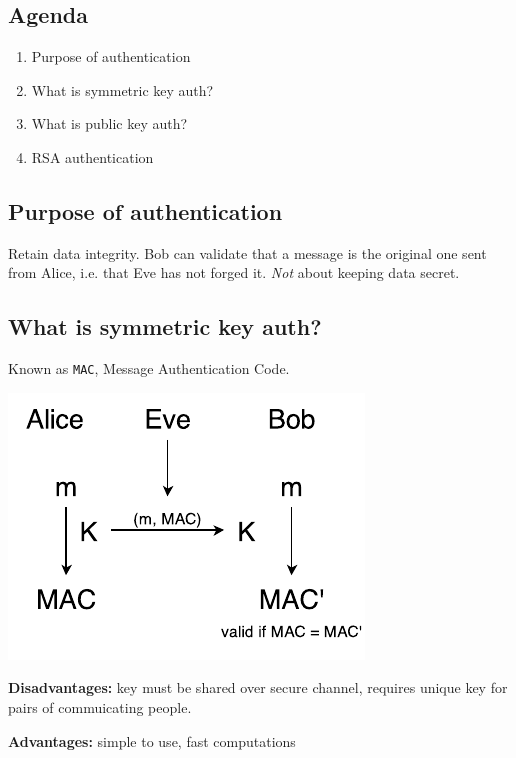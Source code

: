 

\subsection{Agenda}
\begin{enumerate}
\item Purpose of authentication
\item What is symmetric key auth?
\item What is public key auth?
\item RSA authentication
\end{enumerate}

\subsection{Purpose of authentication}
Retain data integrity. Bob can validate that a message is the original one sent from Alice, i.e. that Eve has not forged it. \emph{Not} about keeping data secret.

\subsection{What is symmetric key auth?}
Known as \texttt{MAC}, Message Authentication Code.

\begin{center}
\includegraphics{images/2-sym-AB.pdf}
\end{center}

\textbf{Disadvantages:} key must be shared over secure channel, requires unique key for pairs of commuicating people.

\textbf{Advantages:} simple to use, fast computations

